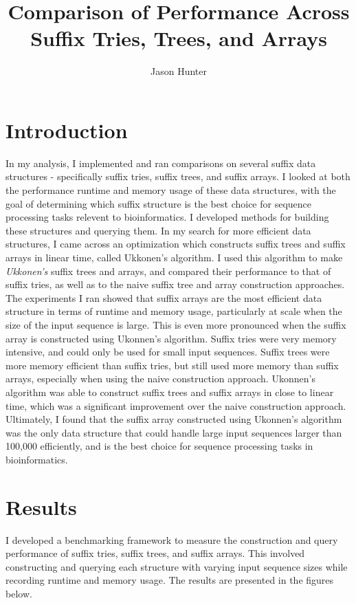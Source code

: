 \documentclass[11pt, letterpaper]{article}
\begin{document}
\title{Comparison of Performance Across Suffix Tries, Trees, and Arrays}
\author{Jason Hunter}
\maketitle

\section{Introduction}
In my analysis, I implemented and ran comparisons on several suffix data structures - 
specifically suffix tries, suffix trees, and suffix arrays. 
I looked at both the performance runtime and memory usage of these data structures, with
the goal of determining which suffix structure is the best choice for sequence processing tasks relevent to bioinformatics.
I developed methods for building these structures and querying them. In my search for more efficient data structures,
I came across an optimization which constructs suffix trees and suffix arrays in linear time, called Ukkonen's algorithm.
I used this algorithm to make \textit{Ukkonen's} suffix trees and arrays, and compared their performance to that of suffix tries,
as well as to the naive suffix tree and array construction approaches. 
The experiments I ran showed that suffix arrays are the most efficient data structure in terms of runtime and memory usage,
particularly at scale when the size of the input sequence is large. This is even more pronounced when the suffix array is constructed using Ukonnen's algorithm.
Suffix tries were very memory intensive, and could only be used for small input sequences. Suffix trees were more memory efficient than suffix tries, but still
used more memory than suffix arrays, especially when using the naive construction approach. Ukonnen's algorithm was able to construct suffix trees and suffix arrays
in close to linear time, which was a significant improvement over the naive construction approach. Ultimately, I found that the suffix array constructed using Ukonnen's algorithm
was the only data structure that could handle large input sequences larger than 100,000 efficiently, and is the best choice for sequence processing tasks in bioinformatics.


\section{Results}
I developed a benchmarking framework to measure the construction and query performance of suffix tries, suffix trees, and suffix arrays. 
This involved constructing and querying each structure with varying input sequence sizes while recording runtime and memory usage. 
The results are presented in the figures below.
\end{document}

